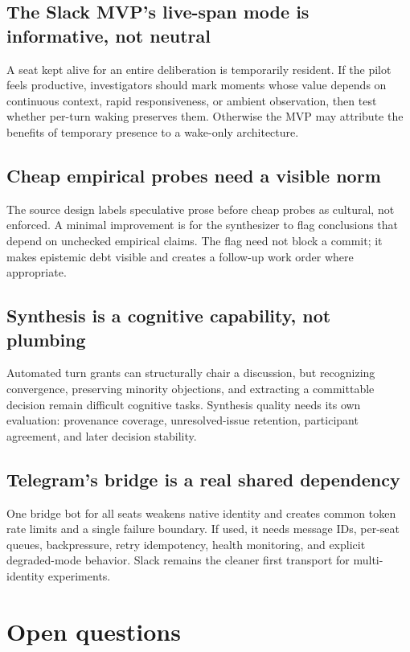 \documentclass[11pt]{article}
\begin{document}
\subsection{The Slack MVP's live-span mode is informative, not neutral}

A seat kept alive for an entire deliberation is temporarily resident. If the
pilot feels productive, investigators should mark moments whose value depends
on continuous context, rapid responsiveness, or ambient observation, then test
whether per-turn waking preserves them. Otherwise the MVP may attribute the
benefits of temporary presence to a wake-only architecture.

\subsection{Cheap empirical probes need a visible norm}

The source design labels speculative prose before cheap probes as cultural,
not enforced. A minimal improvement is for the synthesizer to flag conclusions
that depend on unchecked empirical claims. The flag need not block a commit;
it makes epistemic debt visible and creates a follow-up work order where
appropriate.

\subsection{Synthesis is a cognitive capability, not plumbing}

Automated turn grants can structurally chair a discussion, but recognizing
convergence, preserving minority objections, and extracting a committable
decision remain difficult cognitive tasks. Synthesis quality needs its own
evaluation: provenance coverage, unresolved-issue retention, participant
agreement, and later decision stability.

\subsection{Telegram's bridge is a real shared dependency}

One bridge bot for all seats weakens native identity and creates common token
rate limits and a single failure boundary. If used, it needs message IDs,
per-seat queues, backpressure, retry idempotency, health monitoring, and
explicit degraded-mode behavior. Slack remains the cleaner first transport for
multi-identity experiments.

\section{Open questions}
\end{document}

